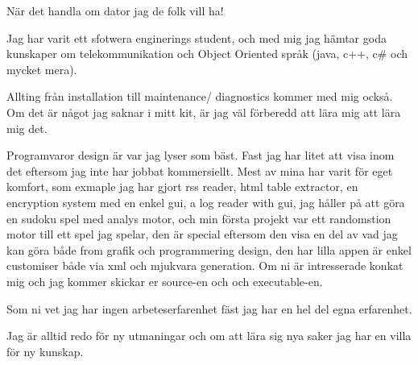 \documentclass[12pt,a4paper]{article}
\begin{document}
	\begin{flushleft}
		\setlength{\parindent}{2ex}
		
			
		
		\hspace{1.5ex}
		När det handla om dator jag de folk vill ha!
		
	Jag har varit ett sfotwera enginerings student, och med mig jag hämtar goda kunskaper om telekommunikation och Object Oriented språk (java, c++, c\# och mycket mera).

	Allting från installation till maintenance/ diagnostics kommer med mig också. Om det är något jag saknar i mitt kit, är jag väl förberedd att lära mig att lära mig det.
	
	
	Programvaror design är var jag lyser som bäst. 
	Fast jag har litet att visa inom det eftersom jag inte har jobbat kommersiellt.
	Mest av mina har varit för eget komfort, som exmaple jag har gjort rss reader, html table extractor, en encryption system med en enkel gui, a log reader with gui, jag håller på att göra en sudoku spel med analys motor, och min första projekt var ett randomstion motor till ett spel jag spelar, den är special eftersom den visa en del av vad jag kan göra både from grafik och programmering design, den har lilla appen är enkel customiser både via xml och mjukvara generation. 
	Om ni är intresserade konkat mig och jag kommer skickar er source-en och och executable-en.
	
	
	Som ni vet jag har ingen arbeteserfarenhet fäst jag har en hel del egna erfarenhet.
	
	\hspace{6pt}
	Jag är alltid redo för ny utmaningar och om att lära sig nya saker jag har en villa för ny kunskap. 

 
	 
	 	

	\end{flushleft}
		
	\newpage
	
\end{document}
